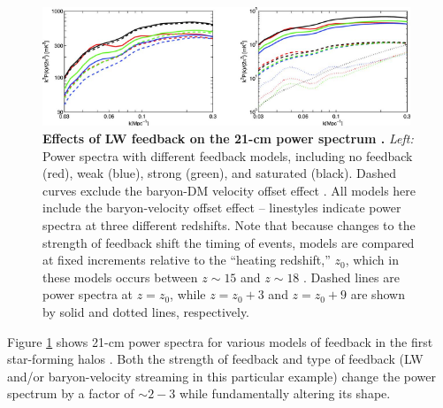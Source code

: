 \begin{figure}[]
\begin{center}
\includegraphics[width=0.98\textwidth]{Mirocha/fialkov2014_fig6.pdf}
\end{center}
\caption{{\bf Effects of LW feedback on the 21-cm power spectrum \cite{Fialkov2013}.} \textit{Left:} Power spectra with different feedback models, including no feedback (red), weak (blue), strong (green), and saturated (black). Dashed curves exclude the baryon-DM velocity offset effect \cite{Tseliakhovich2010}.  All models here include the baryon-velocity offset effect -- linestyles indicate power spectra at three different redshifts. Note that because changes to the strength of feedback shift the timing of events, models are compared at fixed increments relative to the ``heating redshift,'' $z_0$, which in these models occurs between $z\sim 15$ and $z\sim 18$ \cite{Fialkov2013}. Dashed lines are power spectra at $z=z_0$, while $z=z_0+3$ and $z=z_0+9$ are shown by solid and dotted lines, respectively.}
\label{fig:LWfeedback}
\end{figure}

Figure \ref{fig:LWfeedback} shows 21-cm power spectra for various models of feedback in the first star-forming halos \cite{Fialkov2013}. Both the strength of feedback and type of feedback (LW and/or baryon-velocity streaming in this particular example) change the power spectrum by a factor of $\sim 2-3$ while fundamentally altering its shape. 

